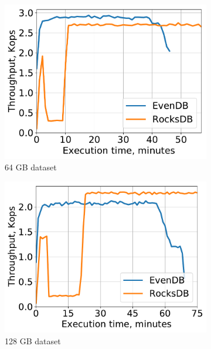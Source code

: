 \begin{figure}[tb]
\centering
\begin{subfigure}{0.3\linewidth}
\includegraphics[width=\textwidth]{figs/throughput_64_scans_10s_line.pdf}
\caption{64 GB dataset}
\label{fig:prod:analytics:a}
\end{subfigure}
\hspace{0.01\linewidth} 
\begin{subfigure}{0.3\linewidth}
\includegraphics[width=\textwidth]{figs/throughput_128_scans_10s_line.pdf}
\caption{128 GB dataset}
\label{fig:prod:analytics:b}
\end{subfigure}
\hspace{0.01\linewidth} 
\begin{subfigure}{0.3\linewidth}

\end{subfigure}
\end{figure}
